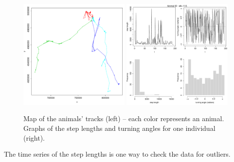 \documentclass[]{article}
\begin{document}
\begin{figure}[h]
	\includegraphics[width=0.49\textwidth]{pictures/map_moveData}
	\includegraphics[width=0.49\textwidth]{pictures/graphs_elk1}
	\caption{Map of the animals' tracks (left) -- each color represents an animal. Graphs of the step lengths and turning angles for one individual (right).}
	\label{moveData}
\end{figure}

The time series of the step lengths is one way to check the data for outliers.
\end{document}
